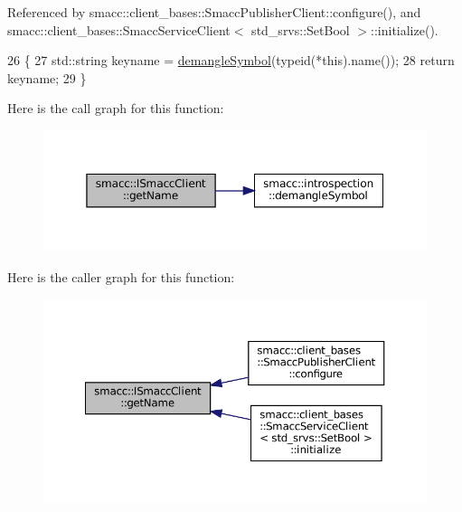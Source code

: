 Referenced by smacc\+::client\+\_\+bases\+::\+Smacc\+Publisher\+Client\+::configure(), and smacc\+::client\+\_\+bases\+::\+Smacc\+Service\+Client$<$ std\+\_\+srvs\+::\+Set\+Bool $>$\+::initialize().


\begin{DoxyCode}
26 \{
27     std::string keyname = \hyperlink{namespacesmacc_1_1introspection_a2f495108db3e57604d8d3ff5ef030302}{demangleSymbol}(\textcolor{keyword}{typeid}(*this).name());
28     \textcolor{keywordflow}{return} keyname;
29 \}
\end{DoxyCode}
Here is the call graph for this function\+:
\nopagebreak
\begin{figure}[H]
\begin{center}
\leavevmode
\includegraphics[width=350pt]{classsmacc_1_1ISmaccClient_a8c3ce19f182e71909c5dc6263d25be69_cgraph}
\end{center}
\end{figure}
Here is the caller graph for this function\+:
\nopagebreak
\begin{figure}[H]
\begin{center}
\leavevmode
\includegraphics[width=350pt]{classsmacc_1_1ISmaccClient_a8c3ce19f182e71909c5dc6263d25be69_icgraph}
\end{center}
\end{figure}
\mbox{\label{classsmacc_1_1ISmaccClient_aec51d4712404cb9882b86e4c854bb93a}} 
